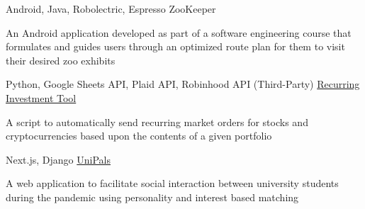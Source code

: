 




\begin{cventries}

  \cventry
  {Android, Java, Robolectric, Espresso} %
  {ZooKeeper} %
  {} %
  {} %
  {\begin{cvitems}
      \item {An Android application developed as part of a software engineering course that formulates and guides users through an optimized route plan for them to visit their desired zoo exhibits}
    \end{cvitems}
  }

  \cventry
  { {Python, Google Sheets API, Plaid API, Robinhood API (Third-Party)}}
  {\href{https://github.com/emmanuelclflores/Recurring-Investment-Tool}{Recurring Investment Tool \faExternalLink}} %
  {} %
  {} %
  {\begin{cvitems}
      \item {A script to automatically send recurring market orders for stocks and cryptocurrencies based upon the contents of a given portfolio }
    \end{cvitems}} %

  \cventry
  {Next.js, Django} %
  {\href{https://github.com/johncmanuel/UniPals}{UniPals \faExternalLink}} %
  {} %
  {} %
  {\begin{cvitems}
      \item {A web application to facilitate social interaction between university students during the pandemic using personality and interest based matching } 
    \end{cvitems}
  }

\end{cventries}